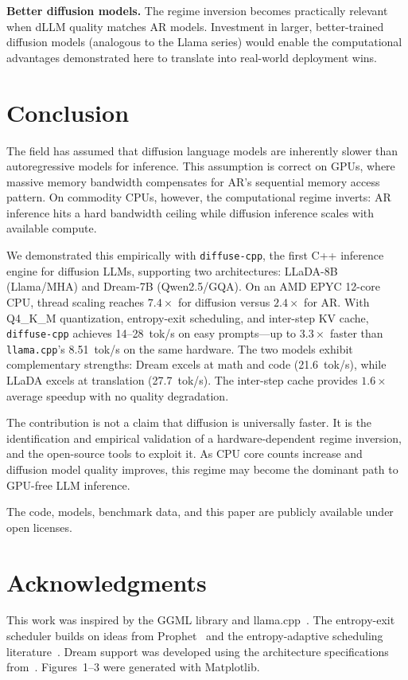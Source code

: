 \documentclass[11pt]{article}
\begin{document}
\textbf{Better diffusion models.} The regime inversion becomes practically relevant when
dLLM quality matches AR models. Investment in larger, better-trained diffusion models
(analogous to the Llama series) would enable the computational advantages demonstrated
here to translate into real-world deployment wins.


\section{Conclusion}

The field has assumed that diffusion language models are inherently slower than
autoregressive models for inference. This assumption is correct on GPUs, where massive
memory bandwidth compensates for AR's sequential memory access pattern. On commodity
CPUs, however, the computational regime inverts: AR inference hits a hard bandwidth
ceiling while diffusion inference scales with available compute.

We demonstrated this empirically with \texttt{diffuse-cpp}, the first C++ inference
engine for diffusion LLMs, supporting two architectures: LLaDA-8B (Llama/MHA) and
Dream-7B (Qwen2.5/GQA). On an AMD EPYC 12-core CPU, thread scaling reaches
$7.4\times$ for diffusion versus $2.4\times$ for AR. With Q4\_K\_M quantization,
entropy-exit scheduling, and inter-step KV cache, \texttt{diffuse-cpp} achieves
14--28~tok/s on easy prompts---up to $3.3\times$ faster than \texttt{llama.cpp}'s
8.51~tok/s on the same hardware. The two models exhibit complementary strengths:
Dream excels at math and code (21.6~tok/s), while LLaDA excels at translation
(27.7~tok/s). The inter-step cache provides $1.6\times$ average speedup with no quality
degradation.

The contribution is not a claim that diffusion is universally faster. It is the
identification and empirical validation of a hardware-dependent regime inversion, and the
open-source tools to exploit it. As CPU core counts increase and diffusion model quality
improves, this regime may become the dominant path to GPU-free LLM inference.

The code, models, benchmark data, and this paper are publicly available under open licenses.


\section*{Acknowledgments}

This work was inspired by the GGML library and llama.cpp~\cite{gerganov2023b}. The
entropy-exit scheduler builds on ideas from Prophet~\cite{li2025} and the
entropy-adaptive scheduling literature~\cite{koh2024,wu2025}. Dream support was
developed using the architecture specifications from~\cite{ye2025}. Figures~1--3 were
generated with Matplotlib.
\end{document}
